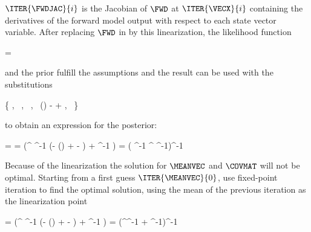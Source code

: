         $\ITER{\FWDJAC}{i}$ is the Jacobian of $\FWD$ at $\ITER{\VECX}{i}$
        containing the derivatives of the forward model output with respect
        to each state vector variable. After replacing $\FWD$ in
         by this linearization, the likelihood
        function

        \startformula
            \LIKELIHOOD = 
        \stopformula

        and the prior  fulfill the assumptions
         and the result  can be used
        with the substitutions

        \startformula
            \{ \VECA \rightarrow \MEANVECA,~
            \MATPI \rightarrow \COVMATA,~
            \MATB \rightarrow {},~
            \VECB \rightarrow \FWD()
                -  
                + \MEANVECERR,~
            \MATQI \rightarrow \COVMATERR \}
        \stopformula

        to obtain an expression for the posterior:
        
        \startformula
        \startalign[n=2,align={right,left}]
            \NC \POSTERIOR = \NC \GAUSS{\VECX}{\MEANVEC}{\COVMAT} \NR
            \NC \MEANVEC = \NC \COVMAT (^\top
                \COVMATERR^{-1} (\VECY - \FWD()
                +   - \MEANVECERR)
                + \COVMATA^{-1} \MEANVECA) \NR
            \NC \COVMAT = \NC 
                ( \COVMATERR^{-1} ^\top
                \COVMATA^{-1})^{-1} \NR
        \stopalign
        \stopformula
        
        Because of the linearization the solution for $\MEANVEC$ and $\COVMAT$
        will not be optimal. Starting from a first guess $\ITER{\MEANVEC}{0}$,
        use fixed-point iteration to find the optimal solution, using the mean
        of the previous iteration as the linearization point

        \startsubformulas[eq:gausspostiter]
        \placesubformula
        \startformula
        \startalign[n=3,align={right,left,right}]
            \NC {} = \NC
                 (^\top
                \COVMATERR^{-1} (\VECY - \FWD()
                +   - \MEANVECERR)
                + \COVMATA^{-1} \MEANVECA) \EQCOMMA \NC \NR[eq:gausspostmeaniter][a]
            \NC {} = \NC
                (^\top \COVMATERR^{-1} 
                + \COVMATA^{-1})^{-1}
                \EQSTOP \NC \NR[eq:gausspostcoviter][b]
        \stopalign
        \stopformula
        \stopsubformulas

